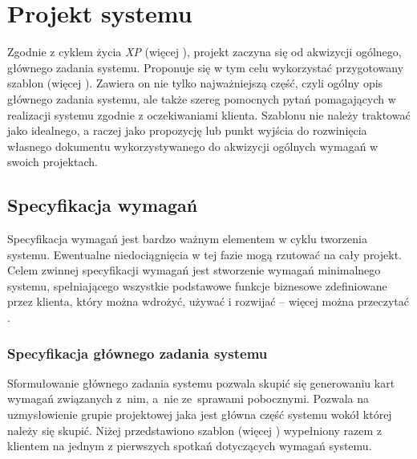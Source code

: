 \chapter{Projekt systemu}
\label{cha:EtapI}

Zgodnie z cyklem życia \textit{XP} (więcej ), projekt zaczyna się od akwizycji ogólnego, głównego zadania systemu. Proponuje się w tym celu wykorzystać przygotowany szablon (więcej ). Zawiera on nie tylko najważniejszą część, czyli ogólny opis głównego zadania systemu, ale także szereg pomocnych pytań pomagających w realizacji systemu zgodnie z oczekiwaniami klienta. Szablonu nie należy traktować jako idealnego, a raczej jako propozycję lub punkt wyjścia do rozwinięcia własnego dokumentu wykorzystywanego do akwizycji ogólnych wymagań w swoich projektach.

\section{Specyfikacja wymagań}
\label{sec:EtapIsw}

Specyfikacja wymagań jest bardzo ważnym elementem w cyklu tworzenia systemu. Ewentualne niedociągnięcia w tej fazie mogą rzutować na cały projekt. Celem zwinnej specyfikacji wymagań jest stworzenie wymagań minimalnego systemu, spełniającego wszystkie podstawowe funkcje biznesowe zdefiniowane przez klienta, który można wdrożyć, używać i rozwijać -- więcej można przeczytać .

\subsection{Specyfikacja głównego zadania systemu}
\label{sec:EtapIswSGZS}

Sformułowanie głównego zadania systemu pozwala skupić się generowaniu kart wymagań związanych z~nim, a~nie ze~sprawami pobocznymi. Pozwala na uzmysłowienie grupie projektowej jaka jest główna część systemu wokół której należy się skupić. Niżej przedstawiono szablon (więcej ) wypełniony razem z klientem na jednym z pierwszych spotkań dotyczących wymagań systemu. 

